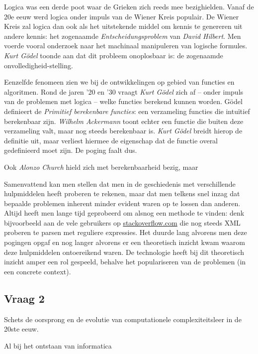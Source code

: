\documentclass[../main.tex]{subfiles}
\begin{document}
\begin{solution}
Logica was een derde poot waar de Grieken zich reeds mee bezighielden. Vanaf de
20e eeuw werd logica onder impuls van de Wiener Kreis populair. De Wiener Kreis
zal logica dan ook als het uitstekende middel om kennis te genereren uit andere kennis:
het zogenaamde \emph{Entscheidungsproblem} van \emph{David Hilbert}.
Men voerde vooral onderzoek naar het machinaal manipuleren van logische formules.
\emph{Kurt G\"odel} toonde aan dat dit probleem onoplosbaar is: de zogenaamde
onvolledigheid-stelling.

Eenzelfde fenomeen zien we bij de ontwikkelingen op gebied van functies en algoritmen.
Rond de jaren '20 en '30 vraagt \emph{Kurt G\"odel} zich af -- onder impuls
van de problemen met logica -- welke functies berekend kunnen worden. G\"odel
definieert de \emph{Primitief berekenbare functies}: een verzameling functies
die intu\"itief berekenbaar zijn. \emph{Wilhelm Ackermann} toont echter een functie
die buiten deze verzameling valt, maar nog steeds berekenbaar is. \emph{Kurt G\"odel}
breidt hierop de definitie uit, maar verliest hiermee de eigenschap dat de functie
overal gedefinieerd moet zijn. De poging faalt dus.

Ook \emph{Alonzo Church} hield zich met berekenbaarheid bezig, maar 

Samenvattend kan men stellen dat men in de geschiedenis met verschillende hulpmiddelen
heeft proberen te rekenen, maar dat men telkens snel inzag dat bepaalde problemen
inherent minder evident waren op te lossen dan anderen. Altijd heeft men lange
tijd geprobeerd om alsnog een methode te vinden: denk bijvoorbeeld aan de vele
gebruikers op \url{stackoverflow.com} die nog steeds XML proberen te parsen met
reguliere expressies. Het duurde lang alvorens men deze pogingen opgaf en nog
langer alvorens er een theoretisch inzicht kwam waarom deze hulpmiddelen ontoereikend
waren. De technologie heeft bij dit theoretisch inzicht amper een rol gespeeld,
behalve het populariseren van de problemen (in een concrete context).
\end{solution}


\subsection{Vraag 2}
\begin{question}
Schets de oorsprong en de evolutie van computationele complexiteitsleer in de 20ste
eeuw.
\end{question}
\begin{solution}
Al bij het ontstaan van informatica
\end{solution}
\end{document}
